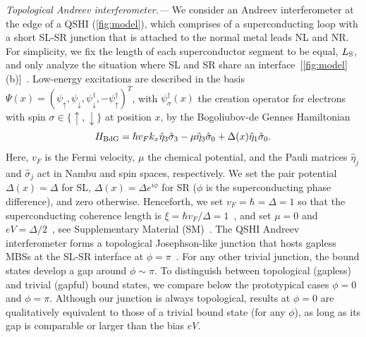 \documentclass[aps,prl,amsmath,twocolumn,floatfix,superscriptaddress,longbibliography,footinbib]{revtex4-1}
\newcommand{\up}{\uparrow}
\newcommand{\dw}{\downarrow}
\begin{document}
\textit{Topological Andreev interferometer.---}
We consider an Andreev interferometer at the edge of a QSHI (\cref{fig:model}), which comprises of a superconducting loop with a short SL-SR junction that is attached to the normal metal leads NL and NR. 
For simplicity, we fix the length of each superconductor segment to be equal, $L_{\text S}$, and only analyze the situation where SL and SR share an interface~[\cref{fig:model}(b)]~\footnotemark[1]. Low-energy excitations are described in the basis $\Psi(x)=(
\psi_{\uparrow},
\psi_{\downarrow},
\psi_{\downarrow}^{\dagger},
-\psi_{\uparrow}^{\dagger})^{T}$, with $\psi^{\dagger}_{\sigma}(x)$ the creation operator for electrons with spin $\sigma\in\{\up,\dw\}$ at position $x$, by the Bogoliubov-de Gennes Hamiltonian~\cite{Cayao2017} 
\begin{equation}\label{Eq:BdG_H}
H_{\rm BdG}=\hbar v_{F}k_{x} \hat{\eta}_{3}\hat{\sigma}_{3}-\mu \hat{\eta}_{3}\hat{\sigma}_{0} + \Delta (x) \hat{\eta}_{1} \hat{\sigma}_{0} .
\end{equation}
Here, $v_{F}$ is the Fermi velocity, $\mu$ the chemical potential, and the Pauli matrices $\hat{\eta}_{j}$ and $\hat{\sigma}_{j}$ act in Nambu and spin spaces, respectively. 
We set the pair potential $\Delta(x)\!=\!\Delta$ for SL, $\Delta(x)\!=\!\Delta e^{i \phi}$ for SR ($\phi$ is the superconducting phase difference), and zero otherwise. 
Henceforth, 
we set $v_F\!=\!\hbar\!=\!\Delta\!=\!1$ so that the superconducting coherence length is $\xi\!=\!\hbar v_F/\Delta\!=\!1$~\footnotemark[2], 
%
%
and set $\mu\!=\!0$ and $eV=\Delta/2$~\footnotemark[3], 
%
%
see Supplementary Material (SM)~\cite{SM}. 
%
The QSHI Andreev interferometer forms a topological Josephson-like junction that hosts gapless MBSs at the SL-SR interface at $\phi=\pi$~\cite{Fu2009,Cayao2022}. For any other trivial junction, the bound states develop a gap around $\phi\sim\pi$. To distinguish between topological (gapless) and trivial (gapful) bound states, we compare below the prototypical cases $\phi=0$ and $\phi=\pi$. Although our junction is always topological, results at $\phi=0$ are qualitatively equivalent to those of a trivial bound state (for any $\phi$), as long as its gap is comparable or larger than the bias $eV$. 
\end{document}
